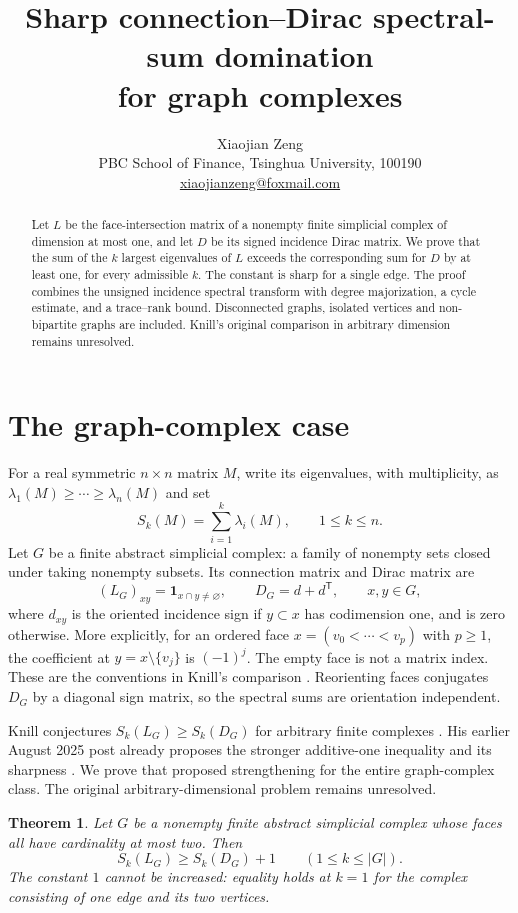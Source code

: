 \documentclass[11pt]{article}
\title{Sharp connection--Dirac spectral-sum domination\\for graph complexes}
\author{Xiaojian Zeng\\[2pt]
\small PBC School of Finance, Tsinghua University, 100190\\
\small \href{mailto:xiaojianzeng@foxmail.com}{xiaojianzeng@foxmail.com}}
\date{}
\newtheorem{theorem}{Theorem}
\newcommand{\T}{\mathsf{T}}
\begin{document}
\maketitle

\begin{abstract}
Let $L$ be the face-intersection matrix of a nonempty finite simplicial
complex of dimension at most one, and let $D$ be its signed incidence Dirac
matrix. We prove that the sum of the $k$ largest eigenvalues of $L$ exceeds
the corresponding sum for $D$ by at least one, for every admissible $k$.
The constant is sharp for a single edge. The proof combines the unsigned
incidence spectral transform with degree majorization, a cycle estimate,
and a trace--rank bound. Disconnected graphs, isolated vertices and
non-bipartite graphs are included. Knill's original comparison in arbitrary
dimension remains unresolved.
\end{abstract}

\section{The graph-complex case}

For a real symmetric $n\times n$ matrix $M$, write its eigenvalues, with
multiplicity, as $\lambda_1(M)\geq\cdots\geq\lambda_n(M)$ and set
\[
 S_k(M)=\sum_{i=1}^k\lambda_i(M),\qquad 1\leq k\leq n.
\]
Let $G$ be a finite abstract simplicial complex: a family of nonempty sets
closed under taking nonempty subsets. Its connection matrix and Dirac matrix
are
\[
 (L_G)_{xy}=\mathbf{1}_{x\cap y\ne\varnothing},\qquad
 D_G=d+d^{\T},\qquad x,y\in G,
\]
where $d_{xy}$ is the oriented incidence sign if $y\subset x$ has codimension
one, and is zero otherwise. More explicitly, for an ordered face
$x=(v_0<\cdots<v_p)$ with $p\geq1$, the coefficient at
$y=x\setminus\{v_j\}$ is $(-1)^j$. The empty face is not a matrix index.
These are the conventions in Knill's comparison
\cite[Sections 1.1 and 5.1--5.3]{Knill2026}. Reorienting faces conjugates
$D_G$ by a diagonal sign matrix, so the spectral sums are orientation
independent.

Knill conjectures $S_k(L_G)\geq S_k(D_G)$ for arbitrary finite complexes
\cite[Conjecture 1]{Knill2026}. His earlier August 2025 post already proposes
the stronger additive-one inequality and its sharpness
\cite[August 17 update]{Knill2025}. We prove that proposed strengthening for
the entire graph-complex class. The original arbitrary-dimensional problem
remains unresolved.

\begin{theorem}\label{thm:main}
Let $G$ be a nonempty finite abstract simplicial complex whose faces all
have cardinality at most two. Then
\begin{equation}\label{eq:main}
 S_k(L_G)\geq S_k(D_G)+1\qquad(1\leq k\leq |G|).
\end{equation}
The constant $1$ cannot be increased: equality holds at $k=1$ for the
complex consisting of one edge and its two vertices.
\end{theorem}
\end{document}
